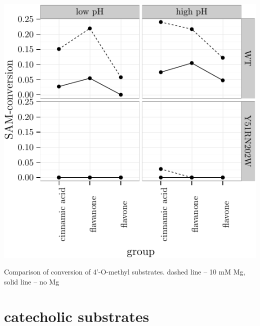 \documentclass[]{tufte-handout}
\begin{document}
\begin{marginfigure}
 \includegraphics{tufte_files/figure-latex/plot_conversion_4Ome-1.pdf}
\caption{Comparison of conversion of 4'-O-methyl substrates. dashed line -- 10 mM Mg, solid line -- no Mg}
\end{marginfigure}

\newpage

\section{catecholic substrates}\label{catecholic-substrates}
\end{document}
